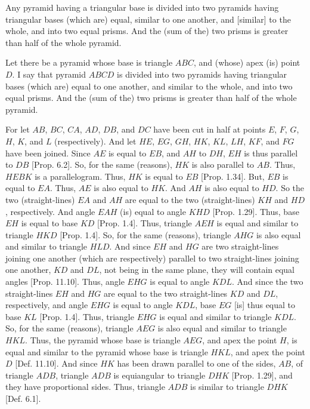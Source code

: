 \begin{Parallel}{}{}
{Any pyramid having a triangular base is divided into two
pyramids having triangular bases (which are) equal, similar to one another, and [similar] to the whole, and into two equal prisms. And the (sum of the) two prisms is greater than half of the
whole pyramid.

\epsfysize=2.2in
\centerline{}

Let there be a pyramid whose base is triangle $ABC$, and (whose) apex (is) point $D$. I say that
pyramid $ABCD$ is divided into two pyramids having triangular bases (which are) equal
to one another, and similar to the whole, and into two equal prisms. And the (sum of the)
two prisms is greater than half of the whole pyramid.

For let $AB$, $BC$, $CA$, $AD$, $DB$, and $DC$ have been cut in half at points $E$, $F$, $G$,
$H$, $K$, and $L$ (respectively). And let $HE$, $EG$, $GH$, $HK$, $KL$, $LH$, $KF$, and $FG$
have been joined. Since $AE$ is equal to $EB$, and $AH$ to $DH$, $EH$ is thus parallel to
$DB$ [Prop. 6.2]. So, for the same (reasons), $HK$ is also parallel
to $AB$. Thus, $HEBK$ is a parallelogram. Thus, $HK$ is equal to $EB$ [Prop. 1.34]. But, $EB$ is equal to $EA$. Thus, $AE$ is also equal to $HK$. And $AH$
is also equal to $HD$. So the two (straight-lines) $EA$ and $AH$ are equal to the two
(straight-lines) $KH$ and $HD$, respectively. And angle $EAH$ (is) equal to angle
$KHD$ [Prop. 1.29]. Thus, base $EH$ is equal to base $KD$ [Prop. 1.4]. Thus, triangle $AEH$ is equal and similar to triangle $HKD$
[Prop. 1.4]. So, for the same (reasons), triangle $AHG$
is also equal and similar to triangle $HLD$. And since $EH$ and $HG$ are two
straight-lines joining one another (which are respectively) parallel to two straight-lines
joining one another, $KD$ and $DL$, not being in the same plane, they will contain
equal angles [Prop. 11.10]. Thus, angle $EHG$ is equal to angle
$KDL$. And since the two straight-lines $EH$ and $HG$ are equal to the two straight-lines
$KD$ and $DL$, respectively, and angle $EHG$ is equal to angle $KDL$, base $EG$
[is] thus equal to base $KL$ [Prop. 1.4]. Thus, triangle $EHG$ is equal
and similar to triangle $KDL$. So, for the same (reasons), triangle $AEG$ is also equal and
similar to triangle $HKL$. Thus, the pyramid whose base is triangle $AEG$,
and apex the point $H$, is equal and similar to the pyramid whose base is triangle $HKL$,
and apex the point $D$ [Def. 11.10]. And since $HK$ has been drawn
parallel to one of the sides, $AB$, of triangle $ADB$, triangle $ADB$
is equiangular to triangle $DHK$ [Prop. 1.29], and they have proportional sides. Thus, triangle $ADB$ is similar to triangle $DHK$ [Def. 6.1].
}
\end{Parallel}
